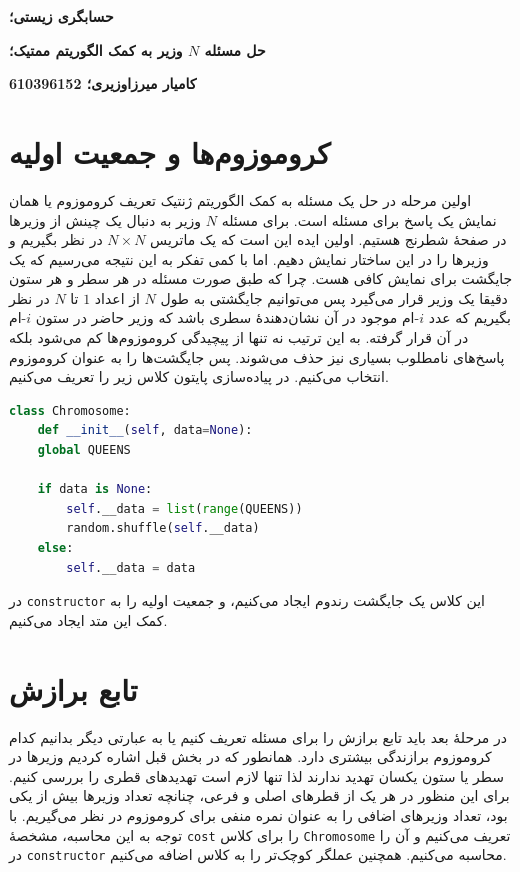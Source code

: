 \documentclass[a4paper, 12pt]{article}
\theoremstyle{definition}
\begin{document}
\textbf{حسابگری زیستی؛}

\textbf{حل مسئله $N$ وزیر به کمک الگوریتم ممتیک؛}

\textbf{کامیار میرزاوزیری؛ 610396152}

\hrulefill

\section{کروموزوم‌ها و جمعیت اولیه}

اولین مرحله در حل یک مسئله به کمک الگوریتم ژنتیک تعریف کروموزوم یا همان نمایش یک پاسخ برای مسئله است. برای مسئله
$N$
وزیر به دنبال یک چینش از وزیرها در صفحهٔ شطرنج هستیم. اولین ایده این است که یک ماتریس
$N \times N$
در نظر بگیریم و وزیرها را در این ساختار نمایش دهیم. اما با کمی تفکر به این نتیجه می‌رسیم که یک جایگشت برای نمایش کافی هست. چرا که طبق صورت مسئله در هر سطر و هر ستون دقیقا یک وزیر قرار می‌گیرد پس می‌توانیم جایگشتی به طول
$N$
از اعداد
$1$
تا
$N$
در نظر بگیریم که عدد
$i$-ام
موجود در آن نشان‌دهندهٔ سطری باشد که وزیر حاضر در ستون
$i$-ام
در آن قرار گرفته. به این ترتیب نه تنها از پیچیدگی کروموزوم‌ها کم می‌شود بلکه پاسخ‌های نامطلوب بسیاری نیز حذف می‌شوند. پس جایگشت‌ها را به عنوان کروموزوم انتخاب می‌کنیم. در پیاده‌سازی پایتون کلاس زیر را تعریف می‌کنیم.

\LTR
\begin{lstlisting}[language=Python]
class Chromosome:
    def __init__(self, data=None):
    global QUEENS

    if data is None:
        self.__data = list(range(QUEENS))
        random.shuffle(self.__data)
    else:
        self.__data = data
\end{lstlisting}
\RTL

در
\texttt{constructor}
این کلاس یک جایگشت رندوم ایجاد می‌کنیم، و جمعیت اولیه را به کمک این متد ایجاد می‌کنیم.

\section{تابع برازش}

در مرحلهٔ بعد باید تابع برازش را برای مسئله تعریف کنیم یا به عبارتی دیگر بدانیم کدام کروموزوم برازندگی بیشتری دارد. همانطور که در بخش قبل اشاره کردیم وزیرها در سطر یا ستون یکسان تهدید ندارند لذا تنها لازم است تهدیدهای قطری را بررسی کنیم. برای این منظور در هر یک از قطرهای اصلی و فرعی، چنانچه تعداد وزیرها بیش از یکی بود، تعداد وزیرهای اضافی را به عنوان نمره منفی برای کروموزوم در نظر می‌گیریم. با توجه به این محاسبه، مشخصهٔ
\texttt{cost}
را برای کلاس
\texttt{Chromosome}
تعریف می‌کنیم و آن را در
\texttt{constructor}
محاسبه می‌کنیم. همچنین عملگر کوچک‌تر را به کلاس اضافه می‌کنیم.
\end{document}
